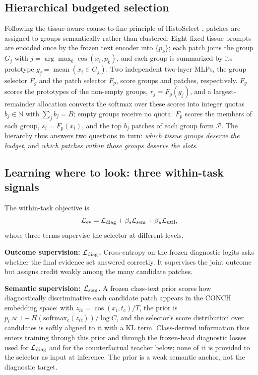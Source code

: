\documentclass{article}
\def\L{{\cal L}}
\newcommand{\Fg}{F_g}
\newcommand{\Fp}{F_p}
\newcommand{\Psel}{\mathcal{P}}
\begin{document}
\subsection{Hierarchical budgeted selection}
\label{ssec:hier}

Following the tissue-aware coarse-to-fine principle of HistoSelect \cite{huang2026histoselect}, patches are assigned to groups semantically rather than clustered. Eight fixed tissue prompts are encoded once by the frozen text encoder into $\{p_k\}$; each patch joins the group $G_j$ with $j=\arg\max_k\cos(x_i,p_k)$, and each group is summarized by its prototype $g_j=\operatorname{mean}(x_i\in G_j)$. Two independent two-layer MLPs, the group selector $\Fg$ and the patch selector $\Fp$, score groups and patches, respectively. $\Fg$ scores the prototypes of the non-empty groups, $r_j=\Fg(g_j)$, and a largest-remainder allocation converts the softmax over these scores into integer quotas $b_j\in\mathbb{N}$ with $\sum_j b_j=B$; empty groups receive no quota. $\Fp$ scores the members of each group, $s_i=\Fp(x_i)$, and the top $b_j$ patches of each group form $\Psel$. The hierarchy thus answers two questions in turn: \emph{which tissue groups deserve the budget}, and \emph{which patches within those groups deserve the slots}.

\subsection{Learning where to look: three within-task signals}
\label{ssec:within}

The within-task objective is
\begin{equation}
\L_{\mathrm{ev}}
=
\L_{\mathrm{diag}}
+\beta_s\L_{\mathrm{sem}}
+\beta_u\L_{\mathrm{util}},
\end{equation}
whose three terms supervise the selector at different levels.

\textbf{Outcome supervision: $\L_{\mathrm{diag}}$.}
Cross-entropy on the frozen diagnostic logits asks whether the final evidence set answered correctly. It supervises the joint outcome but assigns credit weakly among the many candidate patches.

\textbf{Semantic supervision: $\L_{\mathrm{sem}}$.}
A frozen class-text prior scores how diagnostically discriminative each candidate patch appears in the CONCH embedding space: with $z_{ic}=\cos(x_i,t_c)/T$, the prior is $p_i\propto 1-H(\mathrm{softmax}_c(z_{ic}))/\log C$, and the selector's score distribution over candidates is softly aligned to it with a KL term. Class-derived information thus enters training through this prior and through the frozen-head diagnostic losses used for $\L_{\rm diag}$ and for the counterfactual teacher below; none of it is provided to the selector as input at inference. The prior is a weak semantic anchor, not the diagnostic target.
\end{document}

